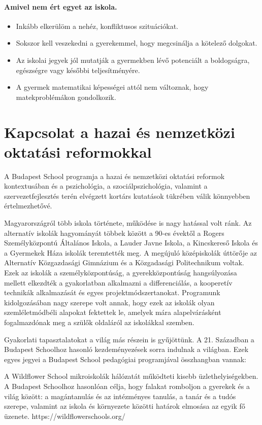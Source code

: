 \paragraph{Amivel nem ért egyet az iskola.}

\begin{itemize}
\item  Inkább elkerülöm a nehéz, konfliktusos szituációkat.
\item Sokszor kell veszekedni a gyerekemmel, hogy megcsinálja a kötelező dolgokat.
\item Az iskolai jegyek jól mutatják a gyermekben lévő potenciált a boldogságra, egészségre vagy későbbi teljesítményére.
\item A gyermek matematikai képességei attól nem változnak, hogy matekproblémákon gondolkozik.
\end{itemize}

\section{Kapcsolat a hazai és nemzetközi oktatási
reformokkal}\label{sec:kapcsolat_reformokkal}

A Budapest School programja a hazai és nemzetközi oktatási reformok
kontextusában és a pszichológia, a szociálpszichológia, valamint a
szervezetfejlesztés terén elvégzett kortárs kutatások tükrében válik
könnyebben értelmezhetővé.

Magyarországról több iskola története, működése is nagy hatással volt ránk. Az
alternatív iskolák hagyományát többek között a 90-es évektől a Rogers
Személyközpontú Általános Iskola, a Lauder Javne Iskola, a Kincskereső
Iskola és a Gyermekek Háza iskolák teremtették meg. A megújuló
középiskolák úttörője az Alternatív Közgazdasági Gimnázium és a
Közgadasági Politechnikum voltak. Ezek az iskolák a személyközpontúság,
a gyerekközpontúság hangsúlyozása mellett elkezdték a gyakorlatban
alkalmazni a differenciálás, a kooperetív technikák alkalmazását és
egyes projektmódszertanokat. Programunk kidolgozásában nagy szerepe volt
annak, hogy ezek az iskolák olyan szemléletmódbéli alapokat fektettek
le, amelyek mára alapelvárásként fogalmazdónak meg a szülők oldaláról az
iskolákkal szemben.

Gyakorlati tapasztalatokat a világ más részein is gyűjöttünk. A 21.
Században a Budapest Schoolhoz hasonló kezdeményezések sorra indulnak a
világban. Ezek egyes jegyei a Budapest School pedagógiai programjával
összhangban vannak:

A Wildflower School mikroiskolák hálózatát működteti kisebb
üzlethelyiségekben. A Budapest Schoolhoz hasonlóan célja, hogy falakat
romboljon a gyerekek és a világ között: a magántanulás és az intézményes
tanulás, a tanár és a tudós szerepe, valamint az iskola és környezete
közötti határok elmosása az egyik fő üzenete.
https://wildflowerschools.org/


